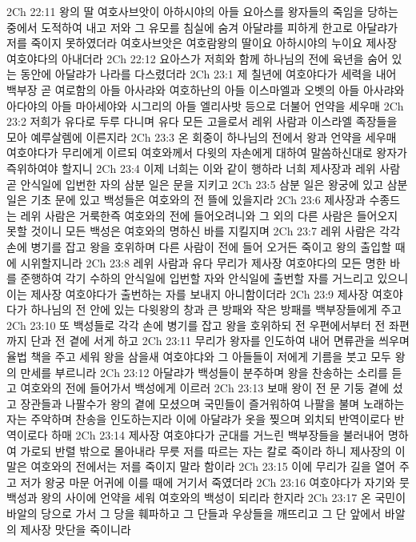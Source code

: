 2Ch 22:11  왕의 딸 여호사브앗이 아하시야의 아들 요아스를 왕자들의 죽임을 당하는 중에서 도적하여 내고 저와 그 유모를 침실에 숨겨 아달랴를 피하게 한고로 아달랴가 저를 죽이지 못하였더라 여호사브앗은 여호람왕의 딸이요 아하시야의 누이요 제사장 여호야다의 아내더라
2Ch 22:12  요아스가 저희와 함께 하나님의 전에 육년을 숨어 있는 동안에 아달랴가 나라를 다스렸더라
2Ch 23:1  제 칠년에 여호야다가 세력을 내어 백부장 곧 여로함의 아들 아사랴와 여호하난의 아들 이스마엘과 오벳의 아들 아사랴와 아다야의 아들 마아세야와 시그리의 아들 엘리사밧 등으로 더불어 언약을 세우매
2Ch 23:2  저희가 유다로 두루 다니며 유다 모든 고을로서 레위 사람과 이스라엘 족장들을 모아 예루살렘에 이른지라
2Ch 23:3  온 회중이 하나님의 전에서 왕과 언약을 세우매 여호야다가 무리에게 이르되 여호와께서 다윗의 자손에게 대하여 말씀하신대로 왕자가 즉위하여야 할지니
2Ch 23:4  이제 너희는 이와 같이 행하라 너희 제사장과 레위 사람 곧 안식일에 입번한 자의 삼분 일은 문을 지키고
2Ch 23:5  삼분 일은 왕궁에 있고 삼분 일은 기초 문에 있고 백성들은 여호와의 전 뜰에 있을지라
2Ch 23:6  제사장과 수종드는 레위 사람은 거룩한즉 여호와의 전에 들어오려니와 그 외의 다른 사람은 들어오지 못할 것이니 모든 백성은 여호와의 명하신 바를 지킬지며
2Ch 23:7  레위 사람은 각각 손에 병기를 잡고 왕을 호위하며 다른 사람이 전에 들어 오거든 죽이고 왕의 출입할 때에 시위할지니라
2Ch 23:8  레위 사람과 유다 무리가 제사장 여호야다의 모든 명한 바를 준행하여 각기 수하의 안식일에 입번할 자와 안식일에 출번할 자를 거느리고 있으니 이는 제사장 여호야다가 출번하는 자를 보내지 아니함이더라
2Ch 23:9  제사장 여호야다가 하나님의 전 안에 있는 다윗왕의 창과 큰 방패와 작은 방패를 백부장들에게 주고
2Ch 23:10  또 백성들로 각각 손에 병기를 잡고 왕을 호위하되 전 우편에서부터 전 좌편까지 단과 전 곁에 서게 하고
2Ch 23:11  무리가 왕자를 인도하여 내어 면류관을 씌우며 율법 책을 주고 세워 왕을 삼을새 여호야댜와 그 아들들이 저에게 기름을 붓고 모두 왕의 만세를 부르니라
2Ch 23:12  아달랴가 백성들이 분주하며 왕을 찬송하는 소리를 듣고 여호와의 전에 들어가서 백성에게 이르러
2Ch 23:13  보매 왕이 전 문 기둥 곁에 섰고 장관들과 나팔수가 왕의 곁에 모셨으며 국민들이 즐거워하여 나팔을 불며 노래하는 자는 주악하며 찬송을 인도하는지라 이에 아달랴가 옷을 찢으며 외치되 반역이로다 반역이로다 하매
2Ch 23:14  제사장 여호야다가 군대를 거느린 백부장들을 불러내어 명하여 가로되 반렬 밖으로 몰아내라 무릇 저를 따르는 자는 칼로 죽이라 하니 제사장의 이 말은 여호와의 전에서는 저를 죽이지 말라 함이라
2Ch 23:15  이에 무리가 길을 열어 주고 저가 왕궁 마문 어귀에 이를 때에 거기서 죽였더라
2Ch 23:16  여호야다가 자기와 뭇 백성과 왕의 사이에 언약을 세워 여호와의 백성이 되리라 한지라
2Ch 23:17  온 국민이 바알의 당으로 가서 그 당을 훼파하고 그 단들과 우상들을 깨뜨리고 그 단 앞에서 바알의 제사장 맛단을 죽이니라
